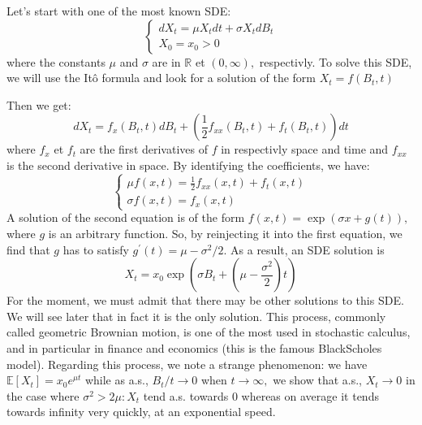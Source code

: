 	Let's start with one of the most known SDE:
	$$
	\left\{\begin{array}{l}
	d X_{t}=\mu X_{t} d t+\sigma X_{t} d B_{t} \\
	X_{0}=x_{0}>0
	\end{array}\right.
	$$
	where the constants $\mu$ and $\sigma$ are in $\mathbb{R}$ et $(0, \infty),$ respectivly. To solve this SDE, we will use the Itô formula and look for a solution of the form $X_{t}=f\left(B_{t}, t\right)$

	Then we get:
	$$
	d X_{t}=f_{x}\left(B_{t}, t\right) d B_{t}+\left(\frac{1}{2} f_{x x}\left(B_{t}, t\right)+f_{t}\left(B_{t}, t\right)\right) d t
	$$
	where $f_{x}$ et $f_{t}$ are the first derivatives of $f$ in respectivly space and time and $f_{x x}$ is the second derivative in space. By identifying the coefficients, we have:
	$$
	\left\{\begin{array}{l}
	\mu f(x, t)=\frac{1}{2} f_{x x}(x, t)+f_{t}(x, t) \\
	\sigma f(x, t)=f_{x}(x, t)
	\end{array}\right.
	$$
	A solution of the second equation is of the form $f(x, t)=\exp (\sigma x+g(t)),$ where $g$ is an arbitrary function. So, by reinjecting it into the first equation, we find that
	$g$ has to satisfy $g^{\prime}(t)=\mu-\sigma^{2} / 2 .$ As a result, an SDE solution is
	$$
	X_{t}=x_{0} \exp \left(\sigma B_{t}+\left(\mu-\frac{\sigma^{2}}{2}\right) t\right)
	$$
	For the moment, we must admit that there may be other solutions to this SDE. We will see later that in fact it is the only solution. This process, commonly called geometric Brownian motion, is one of the most used in stochastic calculus, and in particular in finance and economics (this is the famous BlackScholes model). Regarding this process, we note a strange phenomenon: we have $\mathbb{E}\left[X_{t}\right]=x_{0} e^{\mu t}$ while as a.s., $B_{t} / t \rightarrow 0$ when $t \rightarrow \infty,$ we show that a.s., $X_{t} \rightarrow 0$ in the case where $\sigma^{2}>2 \mu: X_{t}$ tend a.s. towards 0 whereas on average it tends towards infinity very quickly, at an exponential speed.

